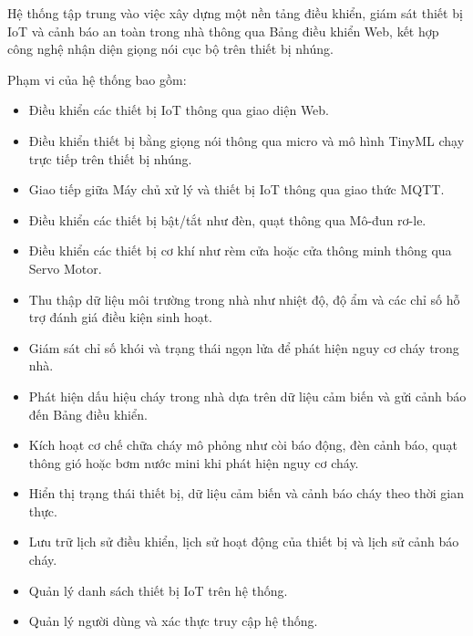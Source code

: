 \documentclass[a4paper,12pt]{article}
\begin{document}
Hệ thống tập trung vào việc xây dựng một nền tảng điều khiển, giám sát thiết bị IoT và cảnh báo an toàn trong nhà thông qua Bảng điều khiển Web, kết hợp công nghệ nhận diện giọng nói cục bộ trên thiết bị nhúng.

Phạm vi của hệ thống bao gồm:

\begin{itemize}
\item Điều khiển các thiết bị IoT thông qua giao diện Web.

\item Điều khiển thiết bị bằng giọng nói thông qua micro và mô hình TinyML chạy trực tiếp trên thiết bị nhúng.

\item Giao tiếp giữa Máy chủ xử lý và thiết bị IoT thông qua giao thức MQTT.

\item Điều khiển các thiết bị bật/tắt như đèn, quạt thông qua Mô-đun rơ-le.

\item Điều khiển các thiết bị cơ khí như rèm cửa hoặc cửa thông minh thông qua Servo Motor.

\item Thu thập dữ liệu môi trường trong nhà như nhiệt độ, độ ẩm và các chỉ số hỗ trợ đánh giá điều kiện sinh hoạt.

\item Giám sát chỉ số khói và trạng thái ngọn lửa để phát hiện nguy cơ cháy trong nhà.

\item Phát hiện dấu hiệu cháy trong nhà dựa trên dữ liệu cảm biến và gửi cảnh báo đến Bảng điều khiển.

\item Kích hoạt cơ chế chữa cháy mô phỏng như còi báo động, đèn cảnh báo, quạt thông gió hoặc bơm nước mini khi phát hiện nguy cơ cháy.

\item Hiển thị trạng thái thiết bị, dữ liệu cảm biến và cảnh báo cháy theo thời gian thực.

\item Lưu trữ lịch sử điều khiển, lịch sử hoạt động của thiết bị và lịch sử cảnh báo cháy.

\item Quản lý danh sách thiết bị IoT trên hệ thống.

\item Quản lý người dùng và xác thực truy cập hệ thống.
\end{itemize}
\end{document}
